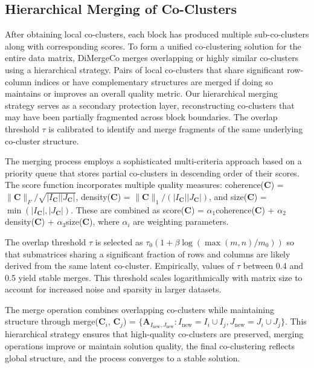 \documentclass[journal]{IEEEtran}
\theoremstyle{definition}
\theoremstyle{remark} %
\begin{document}
\subsection{Hierarchical Merging of Co-Clusters}
\label{subsec:hierarchical-merging}
After obtaining local co-clusters, each block has produced multiple sub-co-clusters along with corresponding scores. To form a unified co-clustering solution for the entire data matrix, DiMergeCo merges overlapping or highly similar co-clusters using a hierarchical strategy. Pairs of local co-clusters that share significant row-column indices or have complementary structures are merged if doing so maintains or improves an overall quality metric. {\color{blue}Our hierarchical merging strategy serves as a secondary protection layer, reconstructing co-clusters that may have been partially fragmented across block boundaries. The overlap threshold $\tau$ is calibrated to identify and merge fragments of the same underlying co-cluster structure.}

The merging process employs a sophisticated multi-criteria approach based on a priority queue that stores partial co-clusters in descending order of their scores. The score function incorporates multiple quality measures: coherence($\mathbf{C}$) = $\|\mathbf{C}\|_F/\sqrt{|I_{\mathbf{C}}||J_{\mathbf{C}}|}$, density($\mathbf{C}$) = $\|\mathbf{C}\|_1/(|I_{\mathbf{C}}||J_{\mathbf{C}}|)$, and size($\mathbf{C}$) = $\min(|I_{\mathbf{C}}|, |J_{\mathbf{C}}|)$. These are combined as score($\mathbf{C}$) = $\alpha_1$coherence($\mathbf{C}$) + $\alpha_2$density($\mathbf{C}$) + $\alpha_3$size($\mathbf{C}$), where $\alpha_i$ are weighting parameters.

The overlap threshold $\tau$ is selected as $\tau_0(1 + \beta\log(\max(m,n)/m_0))$ so that submatrices sharing a significant fraction of rows and columns are likely derived from the same latent co-cluster. Empirically, values of $\tau$ between 0.4 and 0.5 yield stable merges. This threshold scales logarithmically with matrix size to account for increased noise and sparsity in larger datasets.

The merge operation combines overlapping co-clusters while maintaining structure through merge($\mathbf{C}_i$, $\mathbf{C}_j$) = $\{\mathbf{A}_{I_{\text{new}}, J_{\text{new}}} : I_{\text{new}} = I_i \cup I_j, J_{\text{new}} = J_i \cup J_j\}$. This hierarchical strategy ensures that high-quality co-clusters are preserved, merging operations improve or maintain solution quality, the final co-clustering reflects global structure, and the process converges to a stable solution.
\end{document}

